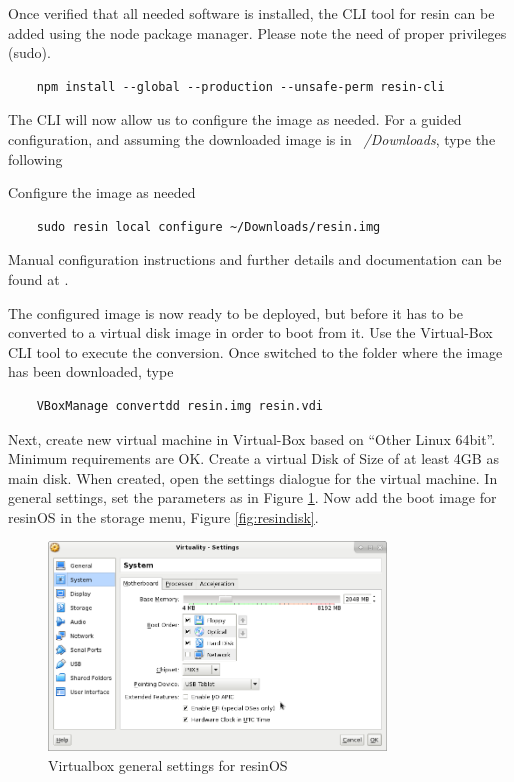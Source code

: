 \documentclass[]{scrartcl}
\begin{document}
Once verified that all needed software is installed, the CLI tool for resin can be added using the node package manager. Please note the need of proper privileges (sudo).

\begin{verbatim}
	npm install --global --production --unsafe-perm resin-cli
\end{verbatim}

The CLI will now allow us to configure the image as needed. For a guided configuration, and assuming the downloaded image is in \textit{~/Downloads}, type the following 

Configure the image as needed
\begin{verbatim}
	sudo resin local configure ~/Downloads/resin.img
\end{verbatim}

Manual configuration instructions and further details and documentation can be found at \cite{resin02}.

The configured image is now ready to be deployed, but before it has to be converted to a virtual disk image in order to boot from it. Use the Virtual-Box CLI tool to execute the conversion. Once switched to the folder where the image has been downloaded, type
\begin{verbatim}
	VBoxManage convertdd resin.img resin.vdi
\end{verbatim}

Next, create new virtual machine in Virtual-Box based on ``Other Linux 64bit''. Minimum requirements are OK. Create a virtual Disk of Size of at least 4GB as main disk. 
When created, open the settings dialogue for the virtual machine. In general settings, set the parameters as in Figure \ref{fig:resingen}. Now add the boot image for resinOS in the storage menu, Figure \ref{fig:resindisk}.

\begin{figure}[t]
	\centering
	\includegraphics[width=0.8\textwidth]{resin-vbox}
	\caption{Virtualbox general settings for resinOS}
	\label{fig:resingen}
\end{figure}
\end{document}
